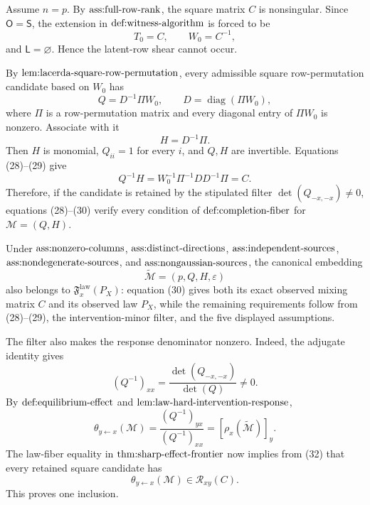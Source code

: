 Assume \(n=p\).  By \(\textnormal{ass:full-row-rank}\), the square matrix \(C\) is nonsingular.  Since \(\mathsf O=\mathsf S\), the extension in
\(\textnormal{def:witness-algorithm}\) is forced to be
\[
 T_0=C,\qquad W_0=C^{-1},
\]
and \(\mathsf L=\varnothing\).  Hence the latent-row shear cannot occur.

By \(\textnormal{lem:lacerda-square-row-permutation}\), every admissible square row-permutation candidate based on \(W_0\) has
\[
 Q=D^{-1}\Pi W_0,\qquad
 D=\operatorname{diag}(\Pi W_0),                                           \tag{28}
\]
where \(\Pi\) is a row-permutation matrix and every diagonal entry of
\(\Pi W_0\) is nonzero.  Associate with it
\[
 H=D^{-1}\Pi.                                                               \tag{29}
\]
Then \(H\) is monomial, \(Q_{ii}=1\) for every \(i\), and \(Q,H\) are invertible.  Equations (28)--(29) give
\[
 Q^{-1}H
 =W_0^{-1}\Pi^{-1}DD^{-1}\Pi
 =C.                                                                        \tag{30}
\]
Therefore, if the candidate is retained by the stipulated filter
\(\det(Q_{-x,-x})\ne0\), equations (28)--(30) verify every condition of
\(\textnormal{def:completion-fiber}\) for \(\mathcal M=(Q,H)\).

Under \(\textnormal{ass:nonzero-columns}\),
\(\textnormal{ass:distinct-directions}\),
\(\textnormal{ass:independent-sources}\),
\(\textnormal{ass:nondegenerate-sources}\), and
\(\textnormal{ass:nongaussian-sources}\), the canonical embedding
\[
 \widetilde{\mathcal M}=(p,Q,H,\varepsilon)
\]
also belongs to \(\mathfrak F_x^{\mathrm{law}}(P_X)\): equation (30) gives both its exact observed mixing matrix \(C\) and its observed law \(P_X\), while the remaining requirements follow from (28)--(29), the intervention-minor filter, and the five displayed assumptions.

The filter also makes the response denominator nonzero.  Indeed, the adjugate identity gives
\[
 (Q^{-1})_{xx}
 =\frac{\det(Q_{-x,-x})}{\det(Q)}\ne0.                                     \tag{31}
\]
By \(\textnormal{def:equilibrium-effect}\) and
\(\textnormal{lem:law-hard-intervention-response}\),
\[
 \theta_{y\leftarrow x}(\mathcal M)
 =\frac{(Q^{-1})_{yx}}{(Q^{-1})_{xx}}
 =[\rho_x(\widetilde{\mathcal M})]_y.                                      \tag{32}
\]
The law-fiber equality in \(\textnormal{thm:sharp-effect-frontier}\) now implies from (32) that every retained square candidate has
\[
 \theta_{y\leftarrow x}(\mathcal M)\in\mathcal R_{xy}(C).                  \tag{33}
\]
This proves one inclusion.

